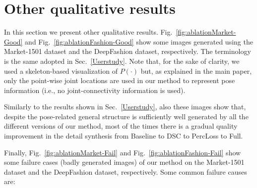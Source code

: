 \documentclass[10pt,twocolumn,letterpaper]{article}
\begin{document}
\section{Other qualitative results}
\label{Other}

In this section we present  other qualitative results. Fig.~\ref{fig:ablationMarket-Good} and 
Fig.~\ref{fig:ablationFashion-Good}
show some images generated using the Market-1501 dataset and the DeepFashion dataset, respectively. The terminology is the same adopted in Sec.~\ref{Userstudy}. Note that, for the sake of clarity, we used a skeleton-based visualization of $P(\cdot)$ but, as explained in the main paper, only the point-wise joint locations are used in our method to represent pose information (i.e., no joint-connectivity information is used).

Similarly to the results shown in Sec.~\ref{Userstudy}, also these images show that, 
despite the pose-related general structure is sufficiently well generated by all the different versions of our method,
most of the times there is a gradual quality improvement in the detail synthesis from Baseline to DSC to PercLoss to Full.

Finally,  Fig.~\ref{fig:ablationMarket-Fail} and 
Fig.~\ref{fig:ablationFashion-Fail} show some failure cases (badly generated images) of our method on the Market-1501 dataset and the DeepFashion dataset, respectively.
Some common failure  causes are:
\end{document}

